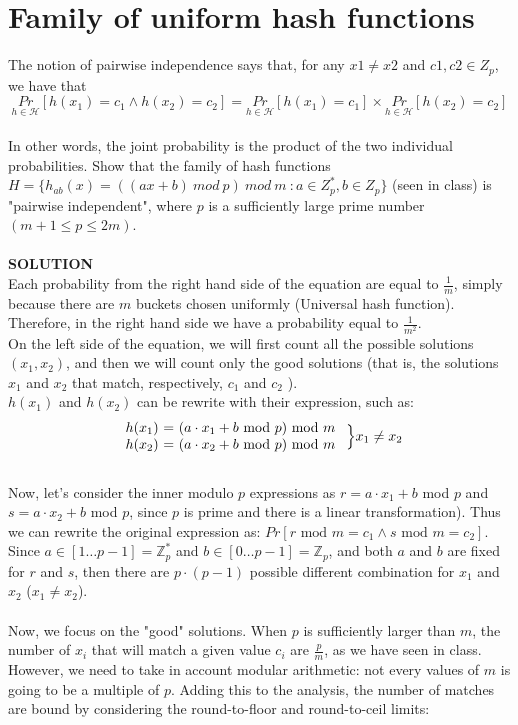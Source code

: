 \documentclass[a4paper]{article}
\begin{document}
\section*{Family of uniform hash functions}
The notion of pairwise independence says that, for any $x1 \neq x2$ and $c1, c2 \in Z_p$, we have that
\[
\underset{h \in \mathcal{H}}{Pr}[h(x_1) = c_1 \wedge h(x_2) = c_2] = \underset{h \in \mathcal{H}}{Pr}[h(x_1) = c_1] \times \underset{h \in \mathcal{H}}{Pr}[h(x_2) = c_2] 
\]\qquad \\
In other words, the joint probability is the product of the two individual probabilities. Show that the family of hash functions $H = \{ h_{ab}(x) = ((ax + b) \ mod \ p)\ mod \ m \ : a \in Z^*_p, b \in Z_p\}$ (seen in class) is "pairwise independent", where $p$ is a sufficiently large prime number $(m + 1 \leq p \leq 2m)$.
\\
\\
\textbf{SOLUTION}
\\
Each probability from the right hand side of the equation are equal to
\(\frac{1}{m}\), simply because there are \(m\) buckets chosen uniformly (Universal hash function).
Therefore, in the right hand side
we have a probability equal to \(\frac{1}{m^2}\). \\ On the left side of the equation, we will first count all the possible solutions $(x_1, x_2)$, and then we will count only the good solutions (that is, the solutions $x_1$ and $x_2$ that match, respectively,  \(c_1\) and \(c_2\) ).\\  \(h(x_1)\) 
and \(h(x_2)\) can be rewrite with their expression, such as:
\[
\left.
\begin{array}{l}
\text{$h(x_1)$ = ($a \cdot x_1 + b$ mod $p$) mod $m$}\\
\text{$h(x_2)$ = ($a \cdot x_2 + b$ mod $p$) mod $m$}
\end{array}
\right. \Bigl\}
x_1 \ne x_2
\]
\qquad \\
Now, let's consider the inner modulo \(p\) expressions as \(r = a\cdot x_1 + b\) mod
\(p\) and \(s = a \cdot x_2 + b\) mod \(p\), since $p$ is prime and there is a linear transformation). 
Thus we can rewrite the original expression as: \({Pr}[r \text{ mod } m = c_1 \wedge s \text{ mod } m = c_2]\). Since
$a \in [1 \dots p-1]=\mathbb{Z}_p^*$ and $b \in [0 \dots p-1]=\mathbb{Z}_p$, and both \(a\) and \(b\) are fixed for \(r\) and \(s\), then there are \(p\cdot(p-1)\) possible different combination for $x_1$ and $x_2$ ($x_1 \neq x_2$). \\
\qquad \\
Now, we focus on the "good" solutions. When \(p\) is sufficiently
larger than \(m\), the number of $x_i$ that will match a given
value \(c_i\) are \(\frac{p}{m}\), as we have seen in class. 
However, we need to take in account modular arithmetic: not every values of \(m\)
is going to be a multiple of \(p\). Adding this to the
analysis, the number of matches are bound by considering the
round-to-floor and round-to-ceil limits:
\end{document}
